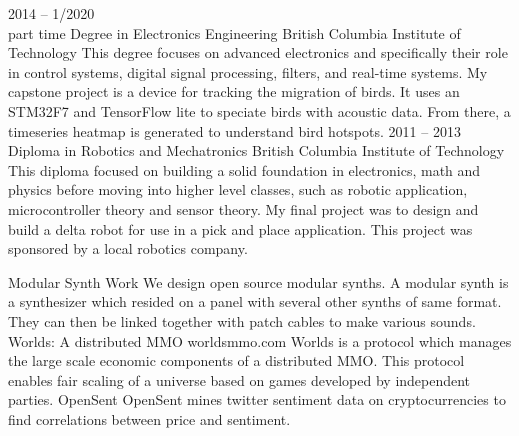 \documentclass[9pt]{developercv} %
\begin{document}
\begin{entrylist}
	\entry
		{2014 -- 1/2020\\ \footnotesize{part time}}
		{Degree in Electronics Engineering}
		{British Columbia Institute of Technology}
		{This degree focuses on advanced electronics and specifically their role in control systems, digital signal processing, filters, and real-time systems. My capstone project is a device for tracking the migration of birds. It uses an STM32F7 and TensorFlow lite to speciate birds with acoustic data. From there, a timeseries heatmap is generated to understand bird hotspots.}
	\entry
		{2011 -- 2013}
		{Diploma in Robotics and Mechatronics}
		{British Columbia Institute of Technology}
		{This diploma focused on building a solid foundation in electronics, math and physics before moving into higher level classes, such as robotic application, microcontroller theory and sensor theory. My final project was to design and build a delta robot for use in a pick and place application. This project was sponsored by a local robotics company.}
\end{entrylist}



\begin{entrylist}
	\entry
		{}
		{Modular Synth Work}
		{}
		{We design open source modular synths. A modular synth is a synthesizer which resided on a panel with several other synths of same format. They can then be linked together with patch cables to make various sounds.}
	\entry
		{}
		{Worlds: A distributed MMO}
		{worldsmmo.com}
		{Worlds is a protocol which manages the large scale economic components of a distributed MMO. This protocol enables fair scaling of a universe based on games developed by independent parties.}
  \entry
		{}
		{OpenSent}
		{}
		{OpenSent mines twitter sentiment data on cryptocurrencies to find correlations between price and sentiment.}

\end{entrylist}
\end{document}
